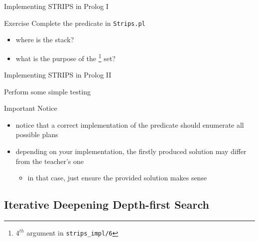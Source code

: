 \documentclass[presentation]{beamer}\mode<presentation>{\usetheme{AMSBolognaFC}}
\begin{document}
\begin{frame}[c]{Implementing STRIPS in Prolog I}
    
    \startExercise

    \begin{block}{Exercise \currentExercise}
        Complete the  predicate in \texttt{Strips.pl}
    \end{block}
    
    \begin{itemize}
        \item where is the stack?
        \item what is the purpose of the \footnote{$4^{th}$ argument in \texttt{strips\_impl/6}} set?
    \end{itemize}

\end{frame}

\begin{frame}[c]{Implementing STRIPS in Prolog II}

    \begin{exampleblock}{Perform some simple testing}
        
    \end{exampleblock}

    \vfill

    \begin{alertblock}{Important Notice}
        \begin{itemize}

            \item notice that a correct implementation of the  predicate should enumerate all possible plans

            \item depending on your implementation, the firstly produced solution may differ from the teacher's one
            \begin{itemize}
                \item in that case, just ensure the provided solution makes sense
            \end{itemize}
        \end{itemize}
    \end{alertblock}

\end{frame}

\subsection{Iterative Deepening Depth-first Search}
\end{document}
